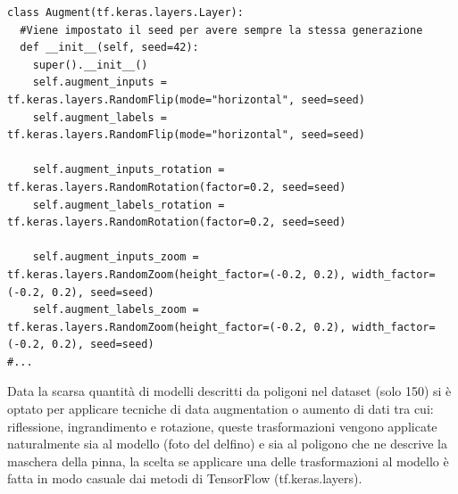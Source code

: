 \documentclass[a4paper,12pt]{report}
\begin{document}
      \begin{lstlisting}
class Augment(tf.keras.layers.Layer):
  #Viene impostato il seed per avere sempre la stessa generazione
  def __init__(self, seed=42):
    super().__init__()
    self.augment_inputs = tf.keras.layers.RandomFlip(mode="horizontal", seed=seed)
    self.augment_labels = tf.keras.layers.RandomFlip(mode="horizontal", seed=seed)
    
    self.augment_inputs_rotation = tf.keras.layers.RandomRotation(factor=0.2, seed=seed)
    self.augment_labels_rotation = tf.keras.layers.RandomRotation(factor=0.2, seed=seed)
    
    self.augment_inputs_zoom = tf.keras.layers.RandomZoom(height_factor=(-0.2, 0.2), width_factor=(-0.2, 0.2), seed=seed)
    self.augment_labels_zoom = tf.keras.layers.RandomZoom(height_factor=(-0.2, 0.2), width_factor=(-0.2, 0.2), seed=seed)
#...
      \end{lstlisting}
 
      Data la scarsa quantità di modelli descritti da poligoni nel dataset (solo 150)
      si è optato per applicare tecniche di data augmentation o aumento di dati tra cui: riflessione, ingrandimento e rotazione,
      queste trasformazioni vengono applicate naturalmente sia al modello (foto del delfino) 
      e sia al poligono che ne descrive la maschera 
      della pinna, la scelta se applicare una delle trasformazioni al modello è fatta in modo 
      casuale dai metodi di TensorFlow (tf.keras.layers).
    
\end{document}
